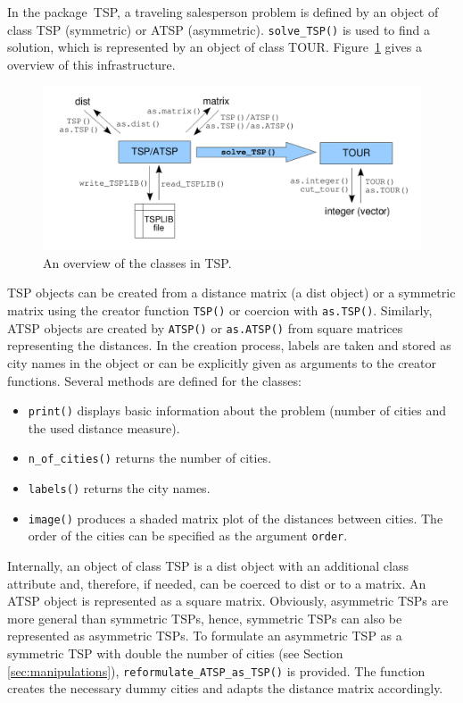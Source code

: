 \documentclass[10pt,a4paper,fleqn]{article}
\newcommand{\strong}[1]{{\normalfont\fontseries{b}\selectfont #1}}
\newcommand{\class}[1]{\mbox{\textsf{#1}}}
\newcommand{\func}[1]{\mbox{\texttt{#1()}}}
\newcommand{\code}[1]{\mbox{\texttt{#1}}}
\newcommand{\pkg}[1]{\strong{#1}}
\begin{document}
In the package~\pkg{TSP}, a traveling salesperson problem is
defined by an object of class \class{TSP} (symmetric) or \class{ATSP}
(asymmetric). \func{solve\_TSP} 
is used to find a solution, which is represented by
an object of class \class{TOUR}. Figure~\ref{fig:overview} gives a overview
of this infrastructure.

\begin{figure}
    \centering
    \includegraphics[width=14cm]{overview}
    \caption{An overview of the classes in \pkg{TSP}.\label{fig:overview}}
\end{figure}


\class{TSP} objects can be created from a distance matrix (a \class{dist}
object) or a symmetric matrix using the creator function \func{TSP} or coercion
with \func{as.TSP}.  Similarly, \class{ATSP} objects are created by \func{ATSP}
or \func{as.ATSP} from square matrices representing the distances.  In the
creation process, labels are taken and stored as city names in the object or
can be explicitly given as arguments to the creator functions.  Several
methods are defined for the classes:
\begin{itemize}
    \item \func{print} displays basic information about the problem (number of
        cities and the used distance measure).
    \item \func{n\_of\_cities} returns the number of cities.
    \item \func{labels} returns the city names.
    \item \func{image} produces a shaded matrix plot of the distances
        between cities. The order of the cities can be specified as the
        argument \code{order}.
\end{itemize}

Internally, an object of class \class{TSP} is a \class{dist} object 
with an additional class attribute and,
therefore, if needed, can be coerced to \class{dist} or to a matrix.  An
\class{ATSP} object is represented as a square matrix.  Obviously, asymmetric
TSPs are more general than symmetric TSPs, hence, symmetric TSPs can also be
represented as asymmetric TSPs.  To formulate an asymmetric TSP as a symmetric
TSP with double the number of cities (see Section \ref{sec:manipulations}),
\func{reformulate\_ATSP\_as\_TSP} is provided. The function creates the
necessary dummy cities and adapts the distance matrix accordingly. 
\end{document}
